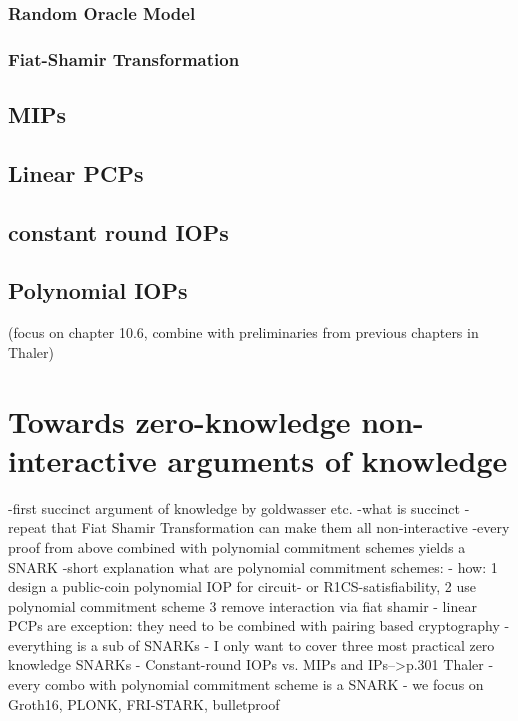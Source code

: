 \subsubsection{Random Oracle Model}
\subsubsection{Fiat-Shamir Transformation}
\begin{comment}
introduced by  GOLDWASSER, Shafi; MICALI, Silvio; RACKOFF, Charles. The
knowledge complexity of interactive proof systems. SIAM Journal
on computing. 1989, vol. 18, no. 1, pp. 186–208.
GKR protocol-->why? GKR protocol is general-purpose in the sense that it solves the problem of arithmetic circuit evaluation, and any problem in P can
be “efficiently” reduced to circuit evaluation
randomness
completeness
soundness
statistical soundness
computational soundness
fiat shamir transformation for non interactive
knowledge soundness
proof of knowledge
obtaining zero knowledge from it: verifier learns nothing about the witness
\end{comment}



\subsection{MIPs}
\subsection{Linear PCPs}
\subsection{constant round IOPs}
\subsection{Polynomial IOPs}
(focus on chapter 10.6, combine with preliminaries from previous chapters in Thaler)

\section{Towards zero-knowledge non-interactive arguments of knowledge}
-first succinct argument of knowledge by goldwasser etc. 
-what is succinct
- repeat that Fiat Shamir Transformation can make them all non-interactive
-every proof from above combined with polynomial commitment schemes yields a SNARK
-short explanation what are polynomial commitment schemes: %
- how: 1 design a public-coin polynomial IOP for circuit- or R1CS-satisfiability, 2 use polynomial commitment scheme 3 remove interaction via fiat shamir
- linear PCPs are exception: they need to be combined with pairing based cryptography
- everything is a sub of SNARKs
- I only want to cover three most practical zero knowledge SNARKs
- Constant-round IOPs vs. MIPs and IPs-->p.301 Thaler
- every combo with polynomial commitment scheme is a SNARK
- we focus on Groth16, PLONK, FRI-STARK, bulletproof

